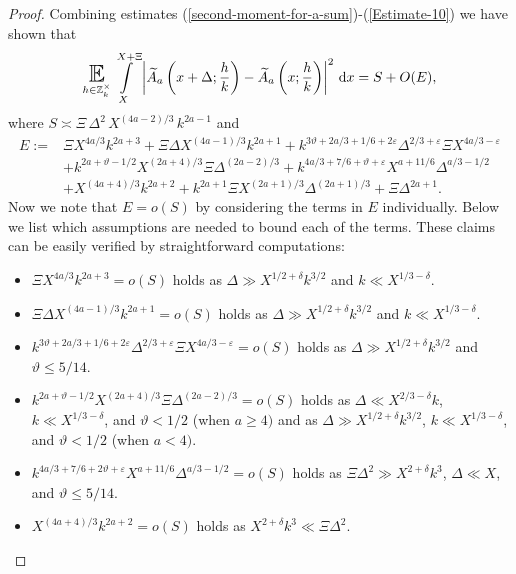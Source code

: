 \documentclass[a4paper,10pt,twoside]{amsart}
\theoremstyle{definition}
\numberwithin{equation}{section}
\newcommand\E{\mathbb{E}}
\newcommand\eps{\varepsilon}
\renewcommand\:{\colon}
\begin{document}
\begin{proof}
Combining estimates (\ref{second-moment-for-a-sum})-(\ref{Estimate-10}) we have shown that
\begin{align*}
\mathop{\text{\LARGE$\E$}}_{h\in\mathbb Z_k^\times}\int\limits_X^{X+\Xi}\left|\widetilde A_a\left(x+\Delta;\frac hk\right)-\widetilde A_a\left(x;\frac hk\right)\right|^2\,\mathrm dx=S+O(E),
\end{align*}
where $S\asymp\Xi\,\Delta^2\,X^{(4a-2)/3}\,k^{2a-1}$ and
\begin{align*}
E:=&\Xi X^{4a/3}k^{2a+3}+\Xi\Delta X^{(4a-1)/3}k^{2a+1}+k^{3\vartheta+2a/3+1/6+2\eps}\Delta^{2/3+\eps}\Xi X^{4a/3-\varepsilon} \\
&+k^{2a+\vartheta-1/2}X^{(2a+4)/3}\Xi\Delta^{(2a-2)/3}+k^{4a/3+7/6+\vartheta+\varepsilon}X^{a+11/6}\Delta^{a/3-1/2}\\
&+X^{(4a+4)/3}k^{2a+2}+k^{2a+1}\Xi X^{(2a+1)/3}\Delta^{(2a+1)/3}+\Xi \Delta^{2a+1}.
\end{align*}
Now we note that $E=o(S)$ by considering the terms in $E$ individually. Below we list which assumptions are needed to bound each of the terms. These claims can be easily verified by straightforward computations:  \\
\begin{itemize}
\item $\Xi X^{4a/3}k^{2a+3}=o(S)$ holds as $\Delta\gg X^{1/2+\delta}k^{3/2}$ and $k\ll X^{1/3-\delta}$.

\item $\Xi\Delta X^{(4a-1)/3}k^{2a+1}=o(S)$ holds as $\Delta\gg X^{1/2+\delta}k^{3/2}$ and $k\ll X^{1/3-\delta}$.

\item $k^{3\vartheta+2a/3+1/6+2\varepsilon}\Delta^{2/3+\varepsilon}\Xi X^{4a/3-\eps}=o(S)$ holds as $\Delta\gg X^{1/2+\delta}k^{3/2}$ and $\vartheta\leq 5/14$.

\item $k^{2a+\vartheta-1/2}X^{(2a+4)/3}\Xi\Delta^{(2a-2)/3}=o(S)$ holds as $\Delta\ll X^{2/3-\delta}k$, $k\ll X^{1/3-\delta}$, and $\vartheta<1/2$ (when $a\geq 4)$ and as $\Delta\gg X^{1/2+\delta}k^{3/2}$, $k\ll X^{1/3-\delta}$, and $\vartheta<1/2$ (when $a<4)$. 

\item $k^{4a/3+7/6+2\vartheta+\varepsilon}X^{a+11/6}\Delta^{a/3-1/2}=o(S)$ holds as $\Xi\Delta^2\gg X^{2+\delta}k^3$, $\Delta\ll X$, and $\vartheta\leq 5/14$.

\item $X^{(4a+4)/3}k^{2a+2}=o(S)$ holds as $X^{2+\delta}k^3\ll\Xi\Delta^2$. 


\end{itemize}
\end{proof}
\end{document}
